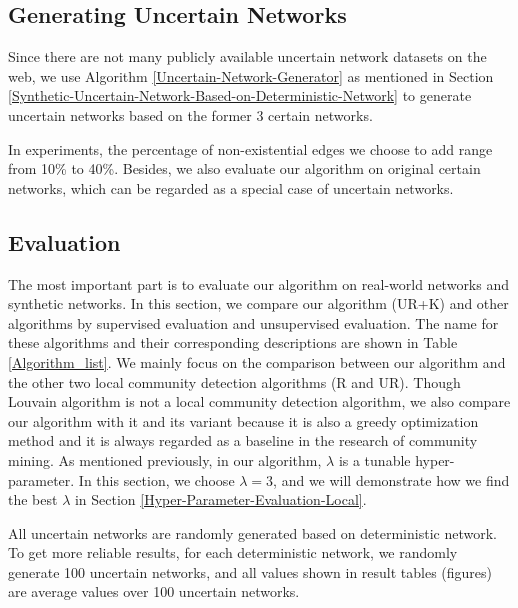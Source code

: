 \documentclass[\main/thesis.tex]{subfiles}
\begin{document}
\subsection*{Generating Uncertain Networks}
Since there are not many publicly available uncertain network datasets on the web, we use Algorithm \ref{Uncertain-Network-Generator} as mentioned in Section \ref{Synthetic-Uncertain-Network-Based-on-Deterministic-Network} to generate uncertain networks based on the former 3 certain networks. 

In experiments, the percentage of non-existential edges we choose to add range from 10\% to 40\%. Besides, we also evaluate our algorithm on original certain networks, which can be regarded as a special case of uncertain networks.

\subsection{Evaluation}
The most important part is to evaluate our algorithm on real-world networks and synthetic networks. In this section, we compare our algorithm (UR+K) and other algorithms by supervised evaluation and unsupervised evaluation. The name for these algorithms and their corresponding descriptions are shown in Table \ref{Algorithm_list}. We mainly focus on the comparison between our algorithm and the other two local community detection algorithms (R and UR). Though Louvain algorithm is not a local community detection algorithm, we also compare our algorithm with it and its variant because it is also a greedy optimization method and it is always regarded as a baseline in the research of community mining. As mentioned previously, in our algorithm, $\lambda$ is a tunable hyper-parameter. In this section, we choose $\lambda=3$, and we will demonstrate how we find the best $\lambda$ in Section \ref{Hyper-Parameter-Evaluation-Local}.

All uncertain networks are randomly generated based on deterministic network. To get more reliable results, for each deterministic network, we randomly generate 100 uncertain networks, and all values shown in result tables (figures) are average values over 100 uncertain networks.
\end{document}
